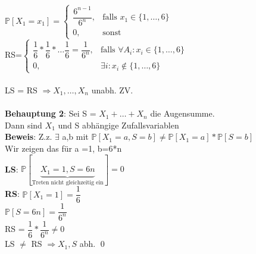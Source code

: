 $\mathds{P}[X_1=x_1]=\begin{cases}
\dfrac{6^{n-1}}{6^n},&\text{falls }x_1 \in \{1,\dots,6\}\\
0,&\text{sonst}
\end{cases}$\medskip\\
RS=$\begin{cases}
\dfrac{1}{6}*\dfrac{1}{6}*\dots\dfrac{1}{6} = \dfrac{1}{6^n},&\text{falls } \forall A_i : x_i \in \{1,\dots,6\}\\
0, & \exists i:x_i \notin \{1,\dots,6\}
\end{cases}$\\\\
LS = RS $\Rightarrow X_1,\dots,X_n$ unabh. ZV.\\\\
\textbf{Behauptung 2}: Sei S = $X_1 + \dots + X_n$ die Augensumme.\\
Dann sind $X_1$ und S abhängige Zufallsvariablen\medskip\\
\textbf{Beweis}: Z.z. $\exists$ a,b mit $\mathds{P}[X_1=a,S=b] \neq \mathds{P}[X_1=a]*\mathds{P}[S=b]$\\
Wir zeigen das für a =1, b=6*n\medskip\\
\textbf{LS}: $\mathds{P}[\underbrace{X_1=1,S=6n}_\text{Treten nicht gleichzeitig ein}] = 0$\smallskip\\
\textbf{RS}: $\mathds{P}[X_1 = 1] = \dfrac{1}{6}$\\$\mathds{P}[S=6n]=\dfrac{1}{6^n}$\medskip\\
RS = $\dfrac{1}{6}*\dfrac{1}{6^n} \neq 0$\medskip\\
LS $\neq$ RS $\Rightarrow$$X_1,S$ abh. \qed
 
